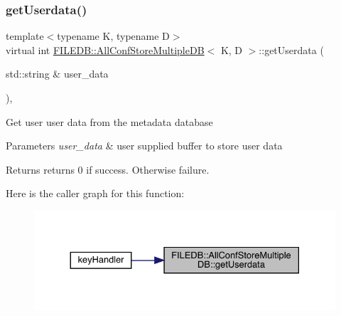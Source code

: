 \subsubsection{\texorpdfstring{getUserdata()}{getUserdata()}\hspace{0.1cm}{\footnotesize\ttfamily [2/3]}}
{\footnotesize\ttfamily template$<$typename K, typename D$>$ \\
virtual int \mbox{\hyperlink{classFILEDB_1_1AllConfStoreMultipleDB}{F\+I\+L\+E\+D\+B\+::\+All\+Conf\+Store\+Multiple\+DB}}$<$ K, D $>$\+::get\+Userdata (\begin{DoxyParamCaption}\item[{std\+::string \&}]{user\+\_\+data }\end{DoxyParamCaption})\hspace{0.3cm}{\ttfamily [inline]}, {\ttfamily [virtual]}}

Get user user data from the metadata database


\begin{DoxyParams}{Parameters}
{\em user\+\_\+data} & user supplied buffer to store user data \\
\hline
\end{DoxyParams}
\begin{DoxyReturn}{Returns}
returns 0 if success. Otherwise failure. 
\end{DoxyReturn}
Here is the caller graph for this function\+:
\nopagebreak
\begin{figure}[H]
\begin{center}
\leavevmode
\includegraphics[width=330pt]{d5/dbe/classFILEDB_1_1AllConfStoreMultipleDB_a9a314fba1056c35ffe54e35e98e83523_icgraph}
\end{center}
\end{figure}
\mbox{\label{classFILEDB_1_1AllConfStoreMultipleDB_a9a314fba1056c35ffe54e35e98e83523}} 
